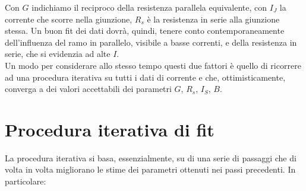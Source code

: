\documentclass[10pt,letterpaper]{article}
\begin{document}
Con $G$ indichiamo il reciproco della resistenza parallela equivalente, con $I_J$ la corrente che scorre nella giunzione, $R_s$ è la resistenza in serie alla giunzione stessa. Un buon fit dei dati dovrà, quindi, tenere conto contemporaneamente dell'influenza del ramo in parallelo, visibile a basse correnti, e della resistenza in serie, che si evidenzia ad alte $I$.\\

Un modo per considerare allo stesso tempo questi due fattori è quello di ricorrere ad una procedura iterativa su tutti i dati di corrente e che, ottimisticamente, converga a dei valori accettabili dei parametri $G$, $R_s$, $I_S$, $B$.

\section{Procedura iterativa di fit}
La procedura iterativa si basa, essenzialmente, su di una serie di passaggi che di volta in volta migliorano le stime dei parametri ottenuti nei passi precedenti. In particolare:
\end{document}
